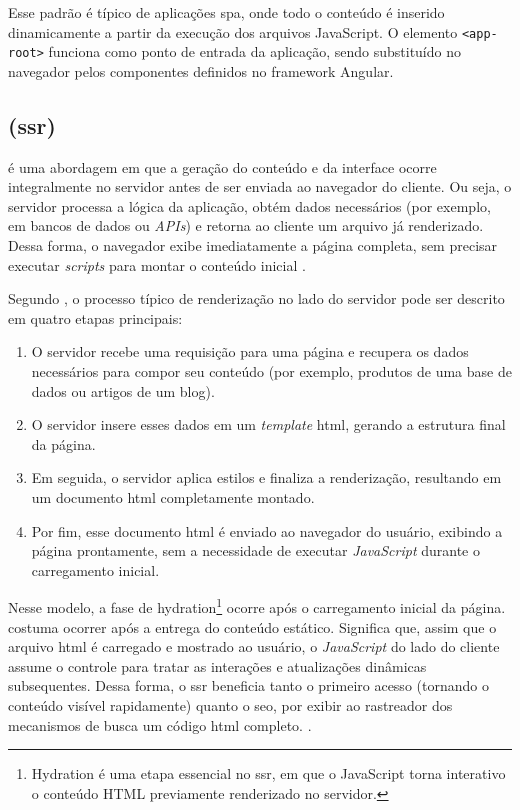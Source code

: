 Esse padrão é típico de aplicações \acrshort{spa}, onde todo o conteúdo é inserido dinamicamente a partir da execução dos arquivos JavaScript. O elemento \texttt{<app-root>} funciona como ponto de entrada da aplicação, sendo substituído no navegador pelos componentes definidos no framework Angular. {\cite{atori2024}}


\subsection{ (\acrshort{ssr})}
\label{subsec:ssr}

  é uma abordagem em que a geração do conteúdo e da interface ocorre integralmente no servidor antes de ser enviada ao navegador do cliente. Ou seja, o servidor processa a lógica da aplicação, obtém dados necessários (por exemplo, em bancos de dados ou \emph{APIs}) e retorna ao cliente um arquivo  já renderizado. Dessa forma, o navegador exibe imediatamente a página completa, sem precisar executar \emph{scripts} para montar o conteúdo inicial \cite{atori2024}. 

Segundo , o processo típico de renderização no lado do servidor pode ser descrito em quatro etapas principais:

\begin{enumerate}
    \item O servidor recebe uma requisição para uma página e recupera os dados necessários para compor seu conteúdo (por exemplo, produtos de uma base de dados ou artigos de um blog).
    \item O servidor insere esses dados em um \emph{template} \acrshort{html}, gerando a estrutura final da página.
    \item Em seguida, o servidor aplica estilos e finaliza a renderização, resultando em um documento \acrshort{html} completamente montado.
    \item Por fim, esse documento \acrshort{html} é enviado ao navegador do usuário, exibindo a página prontamente, sem a necessidade de executar \emph{JavaScript} durante o carregamento inicial.
\end{enumerate}

Nesse modelo, a fase de hydration\footnote{Hydration é uma etapa essencial no \acrshort{ssr}, em que o JavaScript torna interativo o conteúdo HTML previamente renderizado no servidor.} ocorre após o carregamento inicial da página. costuma ocorrer após a entrega do conteúdo estático. Significa que, assim que o arquivo \acrshort{html} é carregado e mostrado ao usuário, o \emph{JavaScript} do lado do cliente assume o controle para tratar as interações e atualizações dinâmicas subsequentes. Dessa forma, o \acrshort{ssr} beneficia tanto o primeiro acesso (tornando o conteúdo visível rapidamente) quanto o \acrshort{seo}, por exibir ao rastreador dos mecanismos de busca um código \acrshort{html} completo. \cite{atori2024}.

